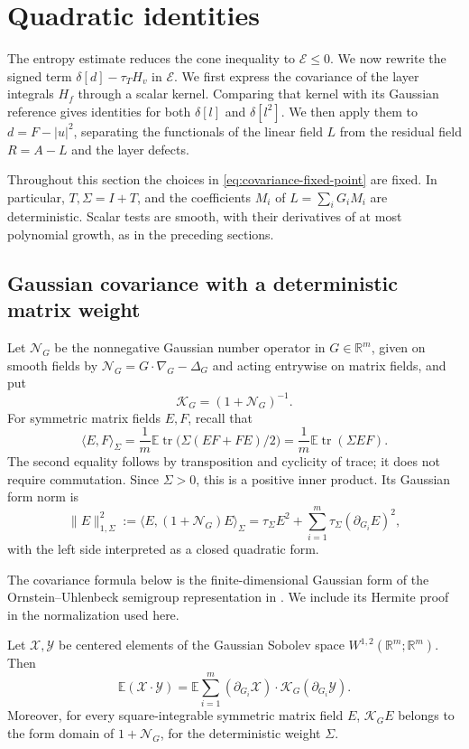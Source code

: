 \section{Quadratic identities}\label{sec:04-quadratic}

The entropy estimate reduces the cone inequality to $\mathcal{E}\le0$. We now rewrite the signed term $\delta[d]-\tau_T H_v$ in $\mathcal{E}$. We first express the covariance of the layer integrals $H_f$ through a scalar kernel. Comparing that kernel with its Gaussian reference gives identities for both $\delta[l]$ and $\delta[l^2]$. We then apply them to $d=F-|u|^2$, separating the functionals of the linear field $L$ from the residual field $R=A-L$ and the layer defects.

Throughout this section the choices in \eqref{eq:covariance-fixed-point} are fixed. In particular, $T,\Sigma=I+T$, and the coefficients $M_i$ of $L=\sum_iG_iM_i$ are deterministic. Scalar tests are smooth, with their derivatives of at most polynomial growth, as in the preceding sections.

\subsection{Gaussian covariance with a deterministic matrix weight}

Let $\mathcal{N}_G$ be the nonnegative Gaussian number operator in $G\in\mathbb{R}^m$, given on smooth fields by $\mathcal{N}_G=G\cdot\nabla_G-\Delta_G$ and acting entrywise on matrix fields, and put
\[
 \mathcal{K}_G=(1+\mathcal{N}_G)^{-1}.
\]
For symmetric matrix fields $E,F$, recall that
\[
 \langle E,F\rangle_\Sigma
   =\frac1m\mathbb{E}\operatorname{tr}\bigl(\Sigma(EF+FE)/2\bigr)
   =\frac1m\mathbb{E}\operatorname{tr}(\Sigma EF).
\]
The second equality follows by transposition and cyclicity of trace; it does not require commutation. Since $\Sigma>0$, this is a positive inner product. Its Gaussian form norm is
\[
 \|E\|_{1,\Sigma}^2
   :=\langle E,(1+\mathcal{N}_G)E\rangle_\Sigma
    =\tau_\Sigma E^2+
       \sum_{i=1}^m\tau_\Sigma(\partial_{G_i}E)^2,
\]
with the left side interpreted as a closed quadratic form.

The covariance formula below is the finite-dimensional Gaussian form of the Ornstein--Uhlenbeck semigroup representation in \cite[Proposition~2.1, Equation~(2.4)]{HoudrePrivault2002}. We include its Hermite proof in the normalization used here.

\begin{lemma}\label{lem:gaussian-covariance}
 Let $\mathcal{X},\mathcal{Y}$ be centered elements of the Gaussian Sobolev space $W^{1,2}(\mathbb{R}^m;\mathbb{R}^m)$. Then
 \[
  \mathbb{E}(\mathcal{X}\cdot\mathcal{Y})
    =\mathbb{E}\sum_{i=1}^m
       (\partial_{G_i}\mathcal{X})\cdot
       \mathcal{K}_G(\partial_{G_i}\mathcal{Y}).
 \]
 Moreover, for every square-integrable symmetric matrix field $E$, $\mathcal{K}_GE$ belongs to the form domain of $1+\mathcal{N}_G$, for the deterministic weight $\Sigma$.
\end{lemma}

